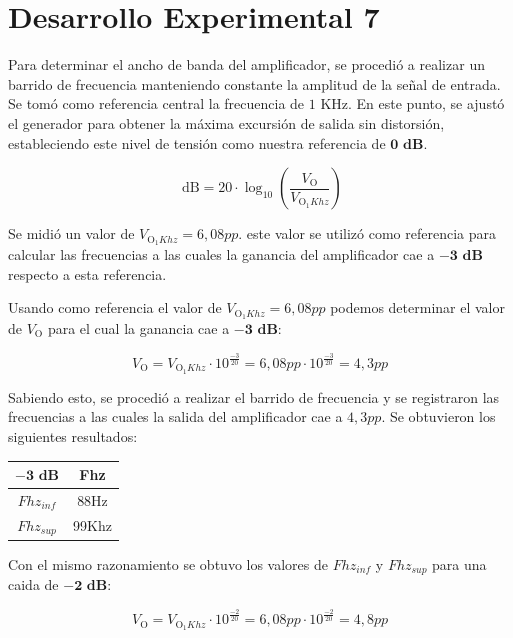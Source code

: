 \section{Desarrollo Experimental 7}
Para determinar el ancho de banda del amplificador, se procedió a realizar un barrido de frecuencia manteniendo constante la amplitud de la señal de entrada. Se tomó como referencia central la frecuencia de $1\text{ KHz}$. En este punto, se ajustó el generador para obtener la máxima excursión de salida sin distorsión, estableciendo este nivel de tensión como nuestra referencia de $\mathbf{0\text{ dB}}$.

\begin{equation*}
\text{ dB}= 20 \cdot \log_{10}\left(\frac{V_{\text{O}}}{V_{\text{O}_1Khz}}\right) 
\end{equation*}

Se midió un valor de $V_{\text{O}_1Khz}=6,08pp$. este valor se utilizó como referencia para calcular las frecuencias a las cuales la ganancia del amplificador cae a $\mathbf{-3\text{ dB}}$ respecto a esta referencia.

Usando como referencia el valor de $V_{\text{O}_1Khz}=6,08pp$ podemos determinar el valor de $V_{\text{O}}$ para el cual la ganancia cae a $\mathbf{-3\text{ dB}}$:

\begin{equation*}
V_{\text{O}} = V_{\text{O}_1Khz} \cdot 10^{\frac{-3}{20}} = 6,08pp \cdot 10^{\frac{-3}{20}} = 4,3pp
\end{equation*}

Sabiendo esto, se procedió a realizar el barrido de frecuencia y se registraron las frecuencias a las cuales la salida del amplificador cae a $4,3pp$. Se obtuvieron los siguientes resultados:

\begin{center}
\begin{tabular}{|c|c|}
\hline
  $\mathbf{-3\text{ dB}}$& Fhz  \\
\hline
$Fhz_{inf}$ & 88Hz  \\
\hline
$Fhz_{sup}$ &  99Khz \\
\hline
\end{tabular}
\end{center}

Con el mismo razonamiento se obtuvo los valores de $Fhz_{inf}$ y $Fhz_{sup}$ para una caida de $\mathbf{-2\text{ dB}}$:

\begin{equation*}
V_{\text{O}} = V_{\text{O}_1Khz} \cdot 10^{\frac{-2}{20}} = 6,08pp \cdot 10^{\frac{-2}{20}} = 4,8pp
\end{equation*}

